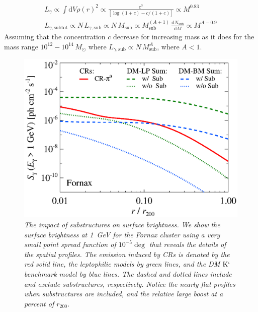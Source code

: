 \documentclass[10pt,aps,pra,reprint,amsmath,amsfonts,amssymb,showpacs]{revtex4-1}
\newcommand{\rmn}{\mathrm}
\newcommand{\sub}{\rmn{sub}}
\newcommand{\msun}{M_\odot}
\newcommand{\Kp}{\rmn{K}`}
\newcommand{\dd}{\rmn{d}}
\newcommand{\rvir}{r_{200}}
\begin{document}
\begin{eqnarray}
L_\gamma \propto \int \dd V \rho(r)^2 \propto \frac{c^3}
{\left[\log\left(1+c\right)-c/(1+c)\right]} \propto M^{0.83}\nonumber\\
L_{\gamma,\rmn{sub tot}} \propto N\,L_{\gamma,\sub} \propto N\,M_\sub 
 \propto M_\sub^{\left(A+1\right)}\,\frac{\dd N_\sub}{\dd M} \propto  M^{A-0.9}
\end{eqnarray}
Assuming that the concentration $c$ decrease for increasing mass as it
does for the mass range $10^{12}-10^{14}\,\msun$ where
$L_{\gamma,\sub} \propto N\,M_\sub^A$, where $A<1$.


\begin{figure}%
 \includegraphics[width=0.99\columnwidth]{figures/SB.resolved.v9.1GeV.SF300.noSuB.vs.SubMass.elmu.eps}
\caption{\it The impact of substructures on surface brightness. We
  show the surface brightness at 1~GeV for the Fornax cluster using a
  very small point spread function of $10^{-5}\deg$ that reveals the
  details of the spatial profiles. The emission induced by CRs is
  denoted by the red solid line, the leptophilic models by green
  lines, and the DM $\Kp$ benchmark model by blue lines. The dashed
  and dotted lines include and exclude substructures,
  respectively. Notice the nearly flat profiles when substructures are
  included, and the relative large boost at a percent of $\rvir$.}
 \label{fig11}
\end{figure}
\end{document}
